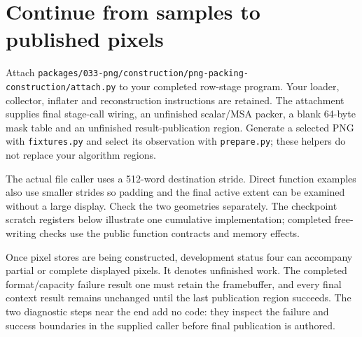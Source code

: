\section{Continue from samples to published pixels}
Attach \texttt{packages/033-png/construction/png-packing-construction/attach.py} to your completed row-stage
program. Your loader, collector, inflater and reconstruction instructions are retained.
The attachment supplies final stage-call wiring, an unfinished scalar/MSA packer,
a blank 64-byte mask table and an unfinished result-publication region. Generate a
selected PNG with \texttt{fixtures.py} and select its observation with
\texttt{prepare.py}; these helpers do not replace your algorithm regions.

The actual file caller uses a 512-word destination stride. Direct function examples
also use smaller strides so padding and the final active extent can be examined
without a large display. Check the two geometries separately. The checkpoint scratch
registers below illustrate one cumulative implementation; completed free-writing
checks use the public function contracts and memory effects.

Once pixel stores are being constructed, development status four can accompany
partial or complete displayed pixels. It denotes unfinished work. The completed
format/capacity failure result one must retain the framebuffer, and every final
context result remains unchanged until the last publication region succeeds.
The two diagnostic steps near the end add no code: they inspect the failure and
success boundaries in the supplied caller before final publication is authored.
